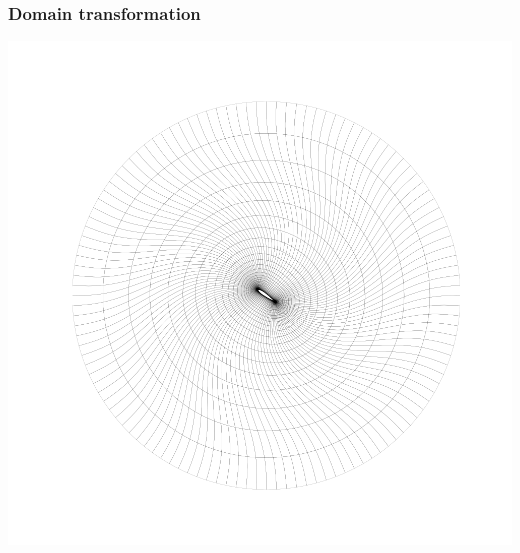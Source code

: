 \documentclass{beamer}
\begin{document}
\begin{frame}
  \frametitle{Domain transformation}

  \begin{center}
    \includegraphics[width=0.8\textheight]{figs/domain}
  \end{center}
\end{frame}
\end{document}
